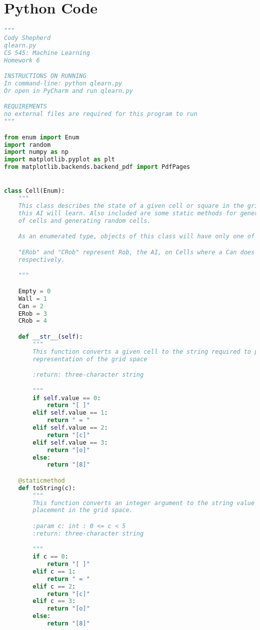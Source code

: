 \documentclass[12pt,a4paper]{article}
\begin{document}
	\section{Python Code}
	\begin{lstlisting}[language=Python,numbers=none,basicstyle=\tiny]
"""
Cody Shepherd
qlearn.py
CS 545: Machine Learning
Homework 6

INSTRUCTIONS ON RUNNING
In command-line: python qlearn.py
Or open in PyCharm and run qlearn.py

REQUIREMENTS
no external files are required for this program to run
"""

from enum import Enum
import random
import numpy as np
import matplotlib.pyplot as plt
from matplotlib.backends.backend_pdf import PdfPages


class Cell(Enum):
    """
    This class describes the state of a given cell or square in the grid environment where
    this AI will learn. Also included are some static methods for generating string representations
    of cells and generating random cells.

    As an enumerated type, objects of this class will have only one of the values declared below.

    "ERob" and "CRob" represent Rob, the AI, on Cells where a Can does not and does also reside,
    respectively.

    """

    Empty = 0
    Wall = 1
    Can = 2
    ERob = 3
    CRob = 4

    def __str__(self):
        """
        This function converts a given cell to the string required to place it in the pictoral
        representation of the grid space

        :return: three-character string

        """
        if self.value == 0:
            return "[ ]"
        elif self.value == 1:
            return " = "
        elif self.value == 2:
            return "[c]"
        elif self.value == 3:
            return "[o]"
        else:
            return "[8]"

    @staticmethod
    def toString(c):
        """
        This function converts an integer argument to the string value appropriate for
        placement in the grid space.

        :param c: int : 0 <= c < 5
        :return: three-character string

        """
        if c == 0:
            return "[ ]"
        elif c == 1:
            return " = "
        elif c == 2:
            return "[c]"
        elif c == 3:
            return "[o]"
        else:
            return "[8]"


\end{lstlisting}
\end{document}
